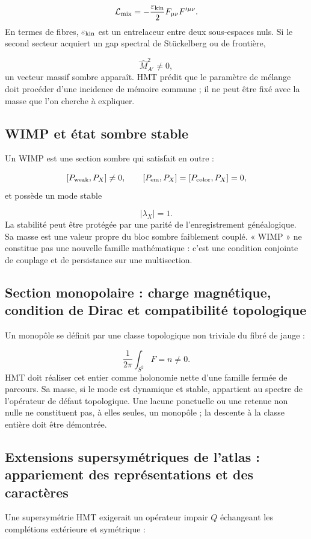 \[
 \mathcal L_{\rm mix}
 =-\frac{\varepsilon_{\rm kin}}2F_{\mu\nu}F'^{\mu\nu}.
\]
En termes de fibres, \(\varepsilon_{\rm kin}\) est un entrelaceur entre deux sous-espaces nuls. Si le second secteur acquiert un gap spectral de Stückelberg ou de frontière,

\[
 \widehat M_{A'}^2\ne0,
\]
un vecteur massif sombre apparaît. HMT prédit que le paramètre de mélange doit procéder d'une incidence de mémoire commune ; il ne peut être fixé avec la masse que l'on cherche à expliquer.

\subsection{WIMP et état sombre stable}
Un WIMP est une section sombre qui satisfait en outre :

\[
 [P_{\rm weak},P_X]\ne0,\qquad
 [P_{\rm em},P_X]=[P_{\rm color},P_X]=0,
\]
et possède un mode stable

\[
 |\lambda_X|=1.
\]
La stabilité peut être protégée par une parité de l'enregistrement généalogique. Sa masse est une valeur propre du bloc sombre faiblement couplé. « WIMP » ne constitue pas une nouvelle famille mathématique : c'est une condition conjointe de couplage et de persistance sur une multisection.

\subsection{Section monopolaire : charge magnétique, condition de Dirac et compatibilité topologique}
Un monopôle se définit par une classe topologique non triviale du fibré de jauge :

\[
 \frac1{2\pi}\int_{S^2}F=n\ne0.
\]
HMT doit réaliser cet entier comme holonomie nette d'une famille fermée de parcours. Sa masse, si le mode est dynamique et stable, appartient au spectre de l'opérateur de défaut topologique. Une lacune ponctuelle ou une retenue non nulle ne constituent pas, à elles seules, un monopôle ; la descente à la classe entière doit être démontrée.

\subsection{Extensions supersymétriques de l'atlas : appariement des représentations et des caractères}
Une supersymétrie HMT exigerait un opérateur impair \(Q\) échangeant les complétions extérieure et symétrique :

